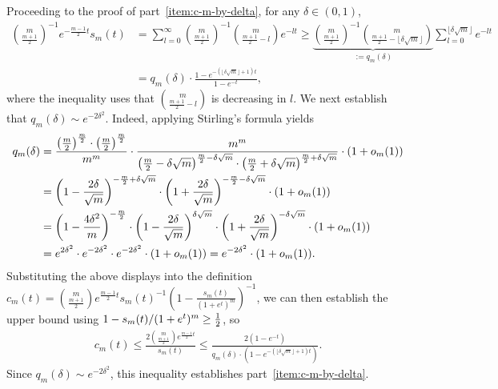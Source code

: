 Proceeding to the proof of part~\ref{item:c-m-by-delta},
for any $\delta \in (0, 1)$,
\begin{align*}
  \binom{m}{\frac{m+1}{2}}^{-1} e^{-\frac{m-1}{2}t} s_m(t) & = \sum_{l=0}^\infty \binom{m}{\frac{m+1}{2}}^{-1} \binom{m}{\frac{m+1}{2} - l} e^{-lt} \geq  \underbrace{\binom{m}{\frac{m+1}{2}}^{-1} \binom{m}{\frac{m+1}{2} - \lfloor \delta \sqrt{m} \rfloor}}_{:=q_m(\delta)} \sum_{l=0}^{\lfloor \delta \sqrt{m} \rfloor} e^{-lt} \nonumber 	\\
  & =  q_m(\delta) \cdot \frac{1 - e^{-(\lfloor \delta \sqrt{m} \rfloor + 1) t}}{1 - e^{-t}},
\end{align*}
where the inequality uses that $\binom{m}{\frac{m+1}{2} - l}$ is decreasing
in $l$. We next establish that $q_m(\delta) \sim e^{-2\delta^2}$. Indeed,
applying Stirling's formula yields
\begin{align*}
 	q_m(\delta) &= \frac{\left({\frac{m}{2}}\right)^{\frac{m}{2}} \cdot \left({\frac{m}{2}}\right)^{\frac{m}{2}}}{m^m} \cdot  \frac{m^m}{\left({\frac{m}{2}-\delta \sqrt{m}}\right)^{\frac{m}{2}-\delta \sqrt{m}} \cdot \left({\frac{m}{2}+\delta \sqrt{m}}\right)^{\frac{m}{2}+\delta \sqrt{m}}} \cdot  (1+o_m(1)) \nonumber \\
 	& = \left({1-\frac{2\delta}{\sqrt{m}}}\right)^{-\frac{m}{2}+\delta \sqrt{m}} \cdot \left({1+\frac{2\delta}{\sqrt{m}}}\right)^{-\frac{m}{2}-\delta \sqrt{m}} \cdot (1+o_m(1)) \nonumber \\
 	& = \left({1-\frac{4\delta^2}{m}}\right)^{-\frac{m}{2}} \cdot \left({1-\frac{2\delta}{\sqrt{m}}}\right)^{\delta \sqrt{m}} \cdot \left({1+\frac{2\delta}{\sqrt{m}}}\right)^{-\delta \sqrt{m}} \cdot (1+o_m(1)) \nonumber \\
 	& = e^{2\delta^2} \cdot e^{-2\delta^2} \cdot e^{-2\delta^2} \cdot (1+o_m(1)) = e^{-2 \delta^2} \cdot (1+o_m(1)).
\end{align*}
Substituting the above displays into the definition $c_m(t) =
\binom{m}{\frac{m + 1}{2}} e^{\frac{m - 1}{2} t} s_m(t)^{-1} (1 -
\frac{s_m(t)}{(1 + e^t)^m})^{-1}$, we can then establish the upper bound
using $1 - s_m(t)/(1+e^t)^m \ge \frac{1}{2}$, so
\begin{align*}
c_m(t) \leq \frac{2\binom{m}{\frac{m+1}{2}} e^{\frac{m-1}{2}t}}{s_m(t)} \leq \frac{2(1-e^{-t})}{q_m(\delta) \cdot (1 - e^{-(\lfloor \delta \sqrt{m} \rfloor + 1) t})}.
\end{align*}
Since $q_m(\delta) \sim e^{-2\delta^2}$, this inequality
establishes part~\ref{item:c-m-by-delta}.

